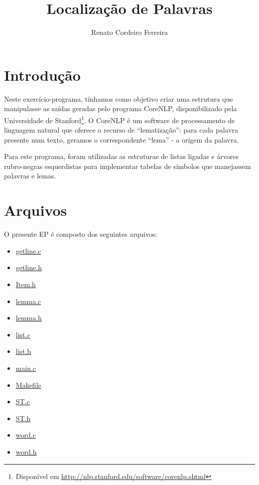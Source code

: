 \documentclass[a4paper,12pt]{article}
\title{Localização de Palavras}
\author{Renato Cordeiro Ferreira}
\begin{document}
\newpage %

\maketitle

\section{Introdução} %

    Neste exercício-programa, tínhamos como objetivo criar uma estrutura
    que manipulasse as saídas geradas pelo programa CoreNLP,
    disponibilizado pela Universidade de Stanford\footnote{Disponível em
    \url{http://nlp.stanford.edu/software/corenlp.shtml}}. O CoreNLP é um
    software de processamento de linguagem natural que oferece o recurso
    de ``lematização'': para cada palavra presente num texto, geramos o
    correspondente ``lema'' - a origem da palavra.

    Para este programa, foram utilizadas as estruturas de listas ligadas
    e árvores rubro-negras esquerdistas para implementar tabelas de
    símbolos que manejassem palavras e lemas.

\section{Arquivos} %
    
    O presente EP é composto dos seguintes arquivos:    
    
    \begin{itemize}
      \item \href{run:./getline.c}{getline.c}
      \item \href{run:./getline.h}{getline.h}
      \item \href{run:./Item.h}{Item.h}
      \item \href{run:./lemma.c}{lemma.c}
      \item \href{run:./lemma.h}{lemma.h}
      \item \href{run:./list.c}{list.c}
      \item \href{run:./list.h}{list.h}
      \item \href{run:./main.c}{main.c}
      \item \href{run:./Makefile}{Makefile}
      \item \href{run:./ST.c}{ST.c}
      \item \href{run:./ST.h}{ST.h}
      \item \href{run:./word.c}{word.c}
      \item \href{run:./word.h}{word.h}
    \end{itemize}
    
\end{document}
